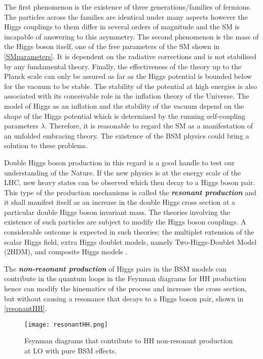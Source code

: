The first phenomenon is the existence of three generations/families of fermions. The particles across the families are identical under many aspects however the Higgs couplings to them differ in several orders of magnitude and the SM is incapable of answering to this asymmetry. The second phenomenon is the mass of the Higgs boson itself, one of the free parameters of the SM shown in \autoref{SMparameters}. It is dependent on the radiative corrections and is not stabilised by any fundamental theory. Finally, the effectiveness of the theory up to the Planck scale can only be assured as far as the Higgs potential is bounded below for the vacuum to be stable. The stability of the potential at high energies is also associated with its conceivable role in the inflation theory of the Universe\cite{Bezrukov2008}. The model of Higgs as an inflation and the stability of the vacuum depend on the shape of the Higgs potential which is determined by the running self-coupling parameters $\lambda$. Therefore, it is reasonable to regard the SM as a manifestation of an unfolded embracing theory. The existence of the BSM physics could bring a solution to these problems.

Double Higgs boson production in this regard is a good handle to test our understanding of the Nature. If the new physics is at the energy scale of the LHC, new heavy states can be observed which then decay to a Higgs boson pair. This type of the production mechanisms is called the \textbf{\textit{resonant production}} and it shall manifest itself as an increase in the double Higgs cross section at a particular double Higgs boson invariant mass. The theories involving the existence of such particles are subject to modify the Higgs boson couplings. A considerable outcome is expected in such theories; the multiplet extension of the scalar Higgs field\cite{Dawson2017}, extra Higgs doublet models, namely Two-Higgs-Doublet Model (2HDM)\cite{Branco2012, BluscaMato2017}, and composite Higgs models \cite{Grber2011, contino2010tasi, JHEP08-2014-095}.

The \textbf{\textit{non-resonant production}} of Higgs pairs in the BSM models can contribute in the quantum loops in the Feynman diagrams for HH production hence can modify the kinematics of the process and increase the cross section, but without causing a resonance that decays to a Higgs boson pair, shown in \autoref{resonantHH}. %


\begin{figure}[ht]
	\centering
	\texttt{[image: resonantHH.png]}
	\vspace{2mm}
	\caption[Feynman diagrams that contribute to HH non-resonant production at LO with pure BSM effects.]
	{Feynman diagrams that contribute to HH non-resonant production at LO with pure BSM effects.}
	\label{resonantHH}
\end{figure}



\newpage
